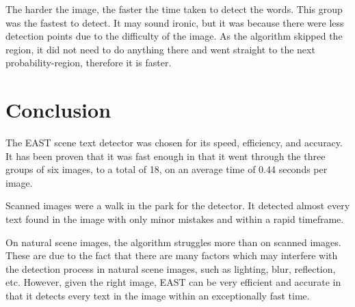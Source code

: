 \documentclass[10pt, a4paper]{article}
\begin{document}
The harder the image, the faster the time taken to detect the words. This group was the fastest to detect. It may sound ironic, but it was because there were less detection points due to the difficulty of the image. As the algorithm skipped the region, it did not need to do anything there and went straight to the next probability-region, therefore it is faster.
\clearpage
\section{Conclusion} %
\label{sec:conclusion}
The EAST scene text detector was chosen for its speed, efficiency, and accuracy. It has been proven that it was fast enough in that it went through the three groups of six images, to a total of 18, on an average time of 0.44 seconds per image. 

Scanned images were a walk in the park for the detector. It detected almost every text found in the image with only minor mistakes and within a rapid timeframe.

On natural scene images, the algorithm struggles more than on scanned images. These are due to the fact that there are many factors which may interfere with the detection process in natural scene images, such as lighting, blur, reflection, etc. However, given the right image, EAST can be very efficient and accurate in that it detects every text in the image within an exceptionally fast time.
\clearpage
\newpage 


\end{document}
